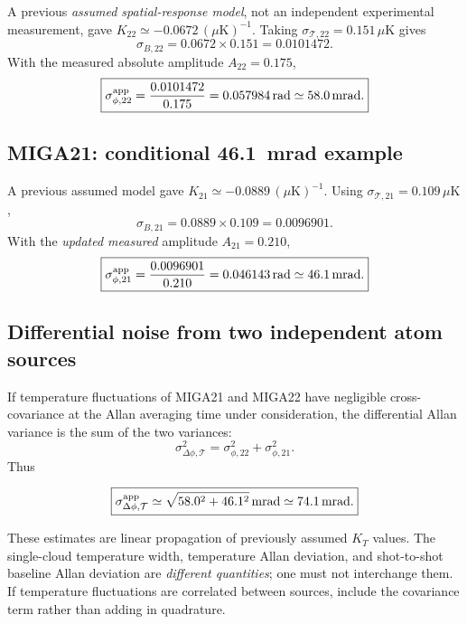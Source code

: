\documentclass[11pt,a4paper]{article}
\numberwithin{equation}{section}
\newcommand{\Tat}{\mathcal{T}}
\begin{document}
A previous \emph{assumed spatial-response model}, not an independent
experimental measurement, gave
$K_{22}\simeq-0.0672\,(\mu\mathrm K)^{-1}$. Taking
$\sigma_{\Tat,22}=0.151\,\mu\mathrm K$ gives
\begin{equation}
\sigma_{B,22}=0.0672\times0.151=0.0101472.
\end{equation}
With the measured absolute amplitude $A_{22}=0.175$,
\begin{equation}
\boxed{\sigma_{\phi,22}^{\rm app}=
 \frac{0.0101472}{0.175}=0.057984\,\mathrm{rad}
 \simeq\SI{58.0}{mrad}.}
\end{equation}

\subsection{MIGA21: conditional \SI{46.1}{mrad} example}

A previous assumed model gave
$K_{21}\simeq-0.0889\,(\mu\mathrm K)^{-1}$.
Using $\sigma_{\Tat,21}=0.109\,\mu\mathrm K$,
\begin{equation}
\sigma_{B,21}=0.0889\times0.109=0.0096901.
\end{equation}
With the \emph{updated measured} amplitude $A_{21}=0.210$,
\begin{equation}
\boxed{\sigma_{\phi,21}^{\rm app}=
 \frac{0.0096901}{0.210}=0.046143\,\mathrm{rad}
 \simeq\SI{46.1}{mrad}.}
\end{equation}

\subsection{Differential noise from two independent atom sources}

If temperature fluctuations of MIGA21 and MIGA22 have negligible
cross-covariance at the Allan averaging time under consideration, the
differential Allan variance is the sum of the two variances:
\begin{equation}
\sigma_{\Delta\phi,\Tat}^2
=\sigma_{\phi,22}^2+\sigma_{\phi,21}^2.
\end{equation}
Thus
\begin{keybox}
\begin{equation}\label{eq:diffans}
\boxed{\sigma_{\Delta\phi,\Tat}^{\rm app}
\simeq\sqrt{58.0^2+46.1^2}\,\mathrm{mrad}
\simeq\SI{74.1}{mrad}.}
\end{equation}
\end{keybox}
These estimates are linear propagation of previously assumed $K_T$ values.
The single-cloud temperature width, temperature Allan deviation, and
shot-to-shot baseline Allan deviation are \emph{different quantities}; one
must not interchange them. If temperature fluctuations are correlated between
sources, include the covariance term rather than adding in quadrature.
\end{document}
